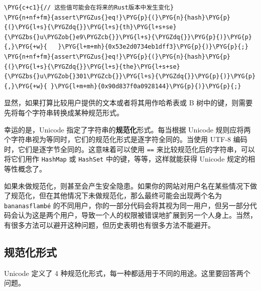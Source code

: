 \begin{Verbatim}[commandchars=\\\{\},breaklines=true,breakanywhere=true,fontsize=\codefont,xleftmargin=17bp]
\PYG{c+c1}{// 这些值可能会在将来的Rust版本中发生变化}
\PYG{n+nf+fm}{assert\PYGZus{}eq!}\PYG{p}{(}\PYG{n}{hash}\PYG{p}{(}\PYG{l+s}{\PYGZdq{}}\PYG{l+s}{th}\PYG{l+s+se}{\PYGZbs{}u\PYGZob{}e9\PYGZcb{}}\PYG{l+s}{\PYGZdq{}}\PYG{p}{)}\PYG{p}{,}\PYG{+w}{   }\PYG{l+m+mh}{0x53e2d0734eb1dff3}\PYG{p}{)}\PYG{p}{;}
\PYG{n+nf+fm}{assert\PYGZus{}eq!}\PYG{p}{(}\PYG{n}{hash}\PYG{p}{(}\PYG{l+s}{\PYGZdq{}}\PYG{l+s}{the}\PYG{l+s+se}{\PYGZbs{}u\PYGZob{}301\PYGZcb{}}\PYG{l+s}{\PYGZdq{}}\PYG{p}{)}\PYG{p}{,}\PYG{+w}{ }\PYG{l+m+mh}{0x90d837f0a0928144}\PYG{p}{)}\PYG{p}{;}
\end{Verbatim}

显然，如果打算比较用户提供的文本或者将其用作哈希表或 B 树中的键，则需要先将每个字符串转换成某种规范形式。

幸运的是，Unicode 指定了字符串的\textbf{规范化}形式。每当根据 Unicode 规则应将两个字符串视为等同时，它们的规范化形式是逐字符全同的。当使用 UTF-8 编码时，它们是逐字节全同的。这意味着可以使用 \texttt{==} 来比较规范化后的字符串，可以将它们用作 \texttt{HashMap} 或 \texttt{HashSet} 中的键，等等，这样就能获得 Unicode 规定的相等性概念了。

如果未做规范化，则甚至会产生安全隐患。如果你的网站对用户名在某些情况下做了规范化，但在其他情况下未做规范化，那么最终可能会出现两个名为 \texttt{bananasflambé} 的不同用户，你的一部分代码会将其视为同一用户，但另一部分代码会认为这是两个用户，导致一个人的权限被错误地扩展到另一个人身上。当然，有很多方法可以避开这种问题，但历史表明也有很多方法不能避开。

\subsection{规范化形式}

Unicode 定义了 4 种规范化形式，每一种都适用于不同的用途。这里要回答两个问题。

